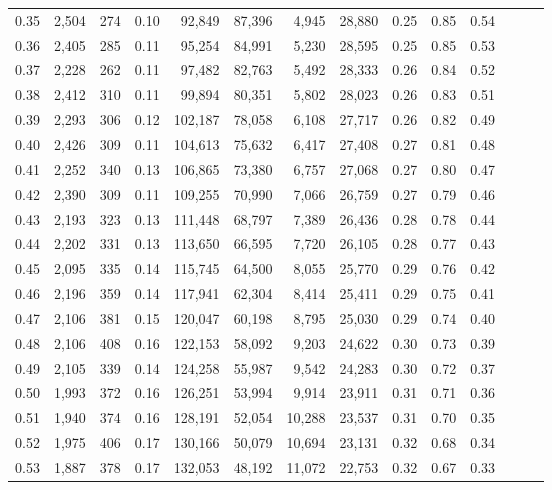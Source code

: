 \begin{tabular}{rrrrrrrrrrrrrr}
0.35 &  2,504 &  274 &  0.10 &   92,849 &   87,396 &   4,945 &  28,880 &  0.25 &  0.85 &      0.54 \\
0.36 &  2,405 &  285 &  0.11 &   95,254 &   84,991 &   5,230 &  28,595 &  0.25 &  0.85 &      0.53 \\
0.37 &  2,228 &  262 &  0.11 &   97,482 &   82,763 &   5,492 &  28,333 &  0.26 &  0.84 &      0.52 \\
0.38 &  2,412 &  310 &  0.11 &   99,894 &   80,351 &   5,802 &  28,023 &  0.26 &  0.83 &      0.51 \\
0.39 &  2,293 &  306 &  0.12 &  102,187 &   78,058 &   6,108 &  27,717 &  0.26 &  0.82 &      0.49 \\
0.40 &  2,426 &  309 &  0.11 &  104,613 &   75,632 &   6,417 &  27,408 &  0.27 &  0.81 &      0.48 \\
0.41 &  2,252 &  340 &  0.13 &  106,865 &   73,380 &   6,757 &  27,068 &  0.27 &  0.80 &      0.47 \\
0.42 &  2,390 &  309 &  0.11 &  109,255 &   70,990 &   7,066 &  26,759 &  0.27 &  0.79 &      0.46 \\
0.43 &  2,193 &  323 &  0.13 &  111,448 &   68,797 &   7,389 &  26,436 &  0.28 &  0.78 &      0.44 \\
0.44 &  2,202 &  331 &  0.13 &  113,650 &   66,595 &   7,720 &  26,105 &  0.28 &  0.77 &      0.43 \\
0.45 &  2,095 &  335 &  0.14 &  115,745 &   64,500 &   8,055 &  25,770 &  0.29 &  0.76 &      0.42 \\
0.46 &  2,196 &  359 &  0.14 &  117,941 &   62,304 &   8,414 &  25,411 &  0.29 &  0.75 &      0.41 \\
0.47 &  2,106 &  381 &  0.15 &  120,047 &   60,198 &   8,795 &  25,030 &  0.29 &  0.74 &      0.40 \\
0.48 &  2,106 &  408 &  0.16 &  122,153 &   58,092 &   9,203 &  24,622 &  0.30 &  0.73 &      0.39 \\
0.49 &  2,105 &  339 &  0.14 &  124,258 &   55,987 &   9,542 &  24,283 &  0.30 &  0.72 &      0.37 \\
0.50 &  1,993 &  372 &  0.16 &  126,251 &   53,994 &   9,914 &  23,911 &  0.31 &  0.71 &      0.36 \\
0.51 &  1,940 &  374 &  0.16 &  128,191 &   52,054 &  10,288 &  23,537 &  0.31 &  0.70 &      0.35 \\
0.52 &  1,975 &  406 &  0.17 &  130,166 &   50,079 &  10,694 &  23,131 &  0.32 &  0.68 &      0.34 \\
0.53 &  1,887 &  378 &  0.17 &  132,053 &   48,192 &  11,072 &  22,753 &  0.32 &  0.67 &      0.33 \\

\end{tabular}
